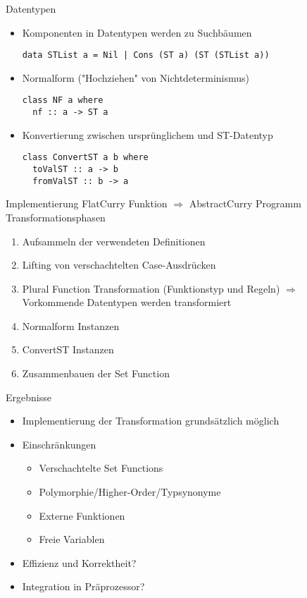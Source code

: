 \documentclass{beamer}
\begin{document}
\begin{frame}[fragile]{Datentypen}
\begin{itemize}
\item Komponenten in Datentypen werden zu Suchbäumen
\begin{verbatim}
data STList a = Nil | Cons (ST a) (ST (STList a))
\end{verbatim}
\item Normalform ("Hochziehen"{} von Nichtdeterminismus)
\begin{verbatim}
class NF a where
  nf :: a -> ST a
\end{verbatim}
\item Konvertierung zwischen ursprünglichem und ST-Datentyp
\begin{verbatim}
class ConvertST a b where
  toValST :: a -> b
  fromValST :: b -> a
\end{verbatim}
\end{itemize}
\end{frame}

\begin{frame}{Implementierung}
FlatCurry Funktion $\Rightarrow$ AbstractCurry Programm
\vfill
Transformationsphasen
\begin{enumerate}
\item Aufsammeln der verwendeten Definitionen
\item Lifting von verschachtelten Case-Ausdrücken
\item Plural Function Transformation (Funktionstyp und Regeln) $\Rightarrow$ 
Vorkommende Datentypen werden transformiert
\item Normalform Instanzen
\item ConvertST Instanzen
\item Zusammenbauen der Set Function
\end{enumerate}
\end{frame}

\begin{frame}{Ergebnisse}
\begin{itemize}
\item Implementierung der Transformation grundsätzlich möglich
\item Einschränkungen
\begin{itemize}
\item Verschachtelte Set Functions
\item Polymorphie/Higher-Order/Typsynonyme
\item Externe Funktionen
\item Freie Variablen
\end{itemize}
\item Effizienz und Korrektheit?
\item Integration in Präprozessor?
\end{itemize}
\end{frame}

\begin{frame}


\end{frame}
\end{document}
